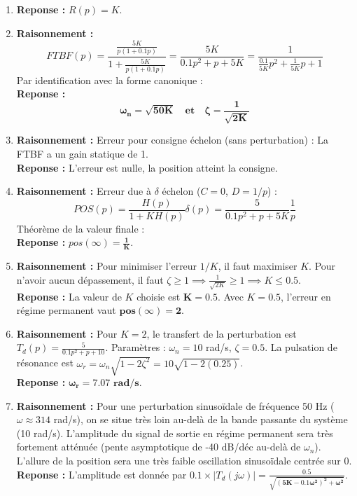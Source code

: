 \documentclass[11pt,a4paper]{article}
\begin{document}
\begin{enumerate}
    \item \textbf{Reponse :} $R(p) = K$.
    \item \textbf{Raisonnement :} 
    $$ FTBF(p) = \frac{\frac{5K}{p(1+0.1p)}}{1+\frac{5K}{p(1+0.1p)}} = \frac{5K}{0.1p^2+p+5K} = \frac{1}{\frac{0.1}{5K}p^2 + \frac{1}{5K}p + 1} $$
    Par identification avec la forme canonique : \\
    \textbf{Reponse :} 
    $$ \mathbf{\omega_n = \sqrt{50K} \quad \text{et} \quad \zeta = \frac{1}{\sqrt{2K}}} $$
    \item \textbf{Raisonnement :} Erreur pour consigne échelon (sans perturbation) : La FTBF a un gain statique de 1. \\
    \textbf{Reponse :} L'erreur est nulle, la position atteint la consigne.
    \item \textbf{Raisonnement :} Erreur due à $\delta$ échelon ($C=0$, $D=1/p$) :
    $$ POS(p) = \frac{H(p)}{1+KH(p)} \delta(p) = \frac{5}{0.1p^2+p+5K} \frac{1}{p} $$
    Théorème de la valeur finale : \\
    \textbf{Reponse :} $pos(\infty) = \mathbf{\frac{1}{K}}$.
    \item \textbf{Raisonnement :} Pour minimiser l'erreur $1/K$, il faut maximiser $K$. Pour n'avoir aucun dépassement, il faut $\zeta \ge 1 \implies \frac{1}{\sqrt{2K}} \ge 1 \implies K \le 0.5$. \\
    \textbf{Reponse :} La valeur de $K$ choisie est $\mathbf{K=0.5}$. Avec $K=0.5$, l'erreur en régime permanent vaut $\mathbf{pos(\infty) = 2}$.
    \item \textbf{Raisonnement :} Pour $K=2$, le transfert de la perturbation est $T_d(p) = \frac{5}{0.1p^2+p+10}$.
    Paramètres : $\omega_n = 10$ rad/s, $\zeta = 0.5$.
    La pulsation de résonance est $\omega_r = \omega_n\sqrt{1-2\zeta^2} = 10\sqrt{1-2(0.25)}$. \\
    \textbf{Reponse :} $\mathbf{\omega_r = 7.07 \text{ rad/s}}$.
    \item \textbf{Raisonnement :} Pour une perturbation sinusoïdale de fréquence 50 Hz ($\omega \approx 314$ rad/s), on se situe très loin au-delà de la bande passante du système (10 rad/s). L'amplitude du signal de sortie en régime permanent sera très fortement atténuée (pente asymptotique de -40 dB/déc au-delà de $\omega_n$). L'allure de la position sera une très faible oscillation sinusoïdale centrée sur 0. \\
    \textbf{Reponse :} L'amplitude est donnée par $0.1 \times |T_d(j\omega)| = \mathbf{\frac{0.5}{\sqrt{(5K - 0.1\omega^2)^2 + \omega^2}}}$.
\end{enumerate}
\end{document}
